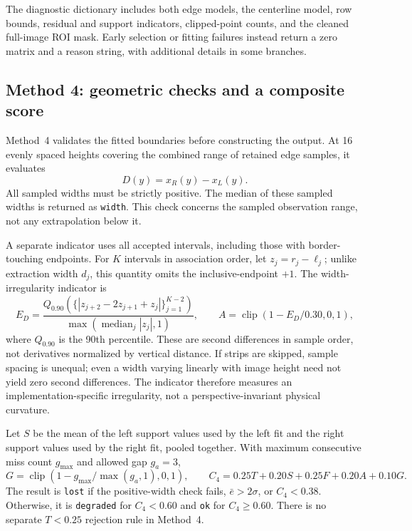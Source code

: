 The diagnostic dictionary includes both edge models, the centerline
model, row bounds, residual and support indicators, clipped-point counts,
and the cleaned full-image ROI mask. Early selection or fitting failures
instead return a zero matrix and a reason string, with additional details
in some branches.

\subsection{Method 4: geometric checks and a composite score}
\label{subsec:c4_output4}

Method~4 validates the fitted boundaries before constructing the output.
At 16 evenly spaced heights covering the combined range of retained
edge samples, it evaluates
\begin{equation}
    D(y)=x_R(y)-x_L(y).
\end{equation}
All sampled widths must be strictly positive. The median of these
sampled widths is returned as \texttt{width}. This check concerns the
sampled observation range, not any extrapolation below it.

A separate indicator uses all accepted intervals, including those with
border-touching endpoints. For $K$ intervals in association order, let
$z_j=r_j-\ell_j$; unlike extraction width $d_j$, this quantity omits the
inclusive-endpoint $+1$. The width-irregularity indicator is
\begin{equation}
    E_D=\frac{Q_{0.90}\left(\{|z_{j+2}-2z_{j+1}+z_j|\}_{j=1}^{K-2}\right)}
                   {\max(\operatorname{median}_j|z_j|,1)},
    \qquad A=\operatorname{clip}(1-E_D/0.30,0,1),
    \label{eq:c4_width_score}
\end{equation}
where $Q_{0.90}$ is the 90th percentile. These are second differences in
sample order, not derivatives normalized by vertical distance. If strips
are skipped, sample spacing is unequal; even a width varying linearly
with image height need not yield zero second differences. The indicator
therefore measures an implementation-specific irregularity, not a
perspective-invariant physical curvature.

Let $S$ be the mean of the left support values used by the left fit and
the right support values used by the right fit, pooled together. With
maximum consecutive miss count $g_{\max}$ and allowed gap $g_a=3$,
\begin{equation}
    G=\operatorname{clip}(1-g_{\max}/\max(g_a,1),0,1),\qquad
    C_4=0.25T+0.20S+0.25F+0.20A+0.10G.
    \label{eq:c4_confidence4}
\end{equation}
The result is \texttt{lost} if the positive-width check fails,
$\bar e>2\sigma$, or $C_4<0.38$. Otherwise, it is \texttt{degraded}
for $C_4<0.60$ and \texttt{ok} for $C_4\geq0.60$.
There is no separate $T<0.25$ rejection rule in Method~4.


